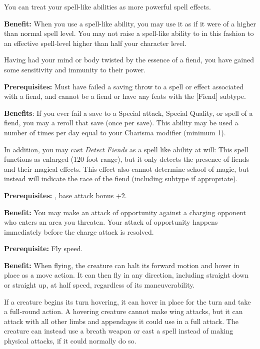 
You can treat your spell-like abilities as more powerful spell effects.

\textbf{Benefit:} When you use a spell-like ability, you may use it as if it were of a higher than normal spell level. You may not raise a spell-like ability to in this fashion to an effective spell-level higher than half your character level.


Having had your mind or body twisted by the essence of a fiend, you have gained some sensitivity and immunity to their power.

\textbf{Prerequisites:} Must have failed a saving throw to a spell or effect associated with a fiend, and cannot be a fiend or have any feats with the [Fiend] subtype.

\textbf{Benefits}: If you ever fail a save to a Special attack, Special Quality, or spell of a fiend, you may a reroll that save (once per save). This ability may be used a number of times per day equal to your Charisma modifier (minimum 1).

In addition, you may cast \textit{Detect Fiends} as a spell like ability at will: This spell functions as enlarged  (120 foot range), but it only detects the presence of fiends and their magical effects. This effect also cannot determine school of magic, but instead will indicate the race of the fiend (including subtype if appropriate).


\textbf{Prerequisites:} , base attack bonus +2.

\textbf{Benefit:} You may make an attack of opportunity against a charging opponent who enters an area you threaten.  Your attack of opportunity happens immediately before the charge attack is resolved.


\textbf{Prerequisite:} Fly speed.

\textbf{Benefit:} When flying, the creature can halt its forward motion and hover in place as a move action. It can then fly in any direction, including straight down or straight up, at half speed, regardless of its maneuverability.

If a creature begins its turn hovering, it can hover in place for the turn and take a full-round action. A hovering creature cannot make wing attacks, but it can attack with all other limbs and appendages it could use in a full attack. The creature can instead use a breath weapon or cast a spell instead of making physical attacks, if it could normally do so.

